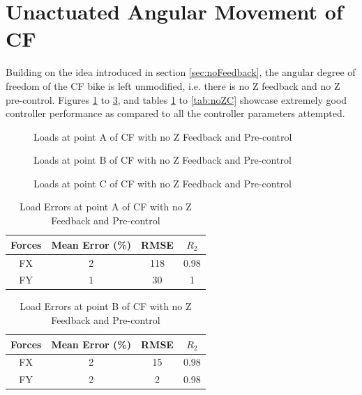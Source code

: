 \section{Unactuated Angular Movement of CF}
Building on the idea introduced in section \ref{sec:noFeedback}, the angular degree of freedom of the CF bike is left unmodified, i.e. there is no Z feedback and no Z pre-control. Figures \ref{fig:noZA} to \ref{fig:noZC}, and tables \ref{tab:noZA} to \ref{tab:noZC} showcase extremely good controller performance as compared to all the controller parameters attempted.
\begin{figure}[h]
	\centering
	\scalebox{0.8}{
		\begin{tikzpicture}
			
	\end{tikzpicture}}
	\caption{Loads at point A of CF with no Z Feedback and Pre-control}
	\label{fig:noZA}
\end{figure}

\begin{figure}[h!]
	\centering
	\scalebox{0.8}{
		\begin{tikzpicture}
			
	\end{tikzpicture}}
	\caption{Loads at point B of CF with no Z Feedback and Pre-control}
	\label{fig:noZB}
\end{figure}

\begin{figure}[h!]
	\centering
	\scalebox{0.8}{
		\begin{tikzpicture}
			
	\end{tikzpicture}}
	\caption{Loads at point C of CF with no Z Feedback and Pre-control}
	\label{fig:noZC}
\end{figure}

\begin{table}[h!]
	\centering
	\begin{tabular}{ |c|c|c|c| } 
		\hline
		Forces & Mean Error (\%) & RMSE & $R_2$\\ 
		\hline
		FX & 2&118&0.98\\ 
		FY & 1&30&1 \\ 
		\hline
	\end{tabular}
	\caption{Load Errors at point A of CF with no Z Feedback and Pre-control}
	\label{tab:noZA}
\end{table}

\begin{table}[h!]
	\centering
	\begin{tabular}{ |c|c|c|c| } 
		\hline
		Forces & Mean Error (\%) & RMSE & $R_2$\\ 
		\hline
		FX & 2&15&0.98\\ 
		FY & 2&2&0.98 \\ 
		\hline
	\end{tabular}
	\caption{Load Errors at point B of CF with no Z Feedback and Pre-control}
	\label{tab:noZB}
\end{table}

